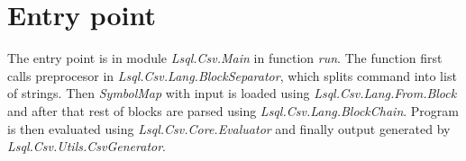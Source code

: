 \section{Entry point}
The entry point is in module \textit{Lsql.Csv.Main} in function \textit{run}. 
The function first calls preprocesor in \textit{Lsql.Csv.Lang.BlockSeparator}, which splits command into list of strings. Then \textit{SymbolMap} with input is loaded using \textit{Lsql.Csv.Lang.From.Block} and after that
rest of blocks are parsed using \textit{Lsql.Csv.Lang.BlockChain}. Program is then evaluated using
\textit{Lsql.Csv.Core.Evaluator} and finally output generated by \textit{Lsql.Csv.Utils.CsvGenerator}.



